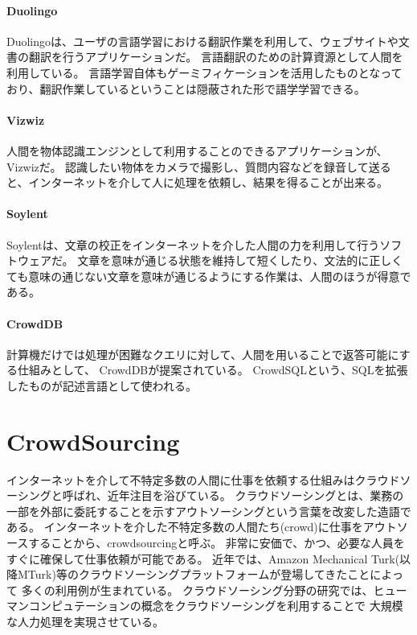 \paragraph{Duolingo}\label{duolingo}

\mbox{}

Duolingo\cite{duolingo}は、ユーザの言語学習における翻訳作業を利用して、ウェブサイトや文書の翻訳を行うアプリケーションだ。
言語翻訳のための計算資源として人間を利用している。
言語学習自体もゲーミフィケーションを活用したものとなっており、翻訳作業しているということは隠蔽された形で語学学習できる。

\paragraph{Vizwiz}\label{vizwiz}

\mbox{}

人間を物体認識エンジンとして利用することのできるアプリケーションが、Vizwiz\cite{vizwiz}だ。
認識したい物体をカメラで撮影し、質問内容などを録音して送ると、インターネットを介して人に処理を依頼し、結果を得ることが出来る。

\paragraph{Soylent}\label{soylent}

\mbox{}

Soylent\cite{soylent}は、文章の校正をインターネットを介した人間の力を利用して行うソフトウェアだ。
文章を意味が通じる状態を維持して短くしたり、文法的に正しくても意味の通じない文章を意味が通じるようにする作業は、人間のほうが得意である。

\paragraph{CrowdDB}\label{crowddb}

\mbox{}

計算機だけでは処理が困難なクエリに対して、人間を用いることで返答可能にする仕組みとして、
CrowdDB\cite{crowddb}が提案されている。
CrowdSQLという、SQLを拡張したものが記述言語として使われる。

\section{CrowdSourcing}\label{crowdsourcing}

インターネットを介して不特定多数の人間に仕事を依頼する仕組みはクラウドソーシングと呼ばれ、近年注目を浴びている。
クラウドソーシングとは、業務の一部を外部に委託することを示すアウトソーシングという言葉を改変した造語である\cite{riseofcrowdsourcing}。
インターネットを介した不特定多数の人間たち(crowd)に仕事をアウトソースすることから、crowdsourcingと呼ぶ。
非常に安価で、かつ、必要な人員をすぐに確保して仕事依頼が可能である。
近年では、Amazon Mechanical
Turk\cite{amt}(以降MTurk)等のクラウドソーシングプラットフォームが登場してきたことによって
多くの利用例が生まれている。
クラウドソーシング分野の研究では、ヒューマンコンピュテーションの概念をクラウドソーシングを利用することで
大規模な人力処理を実現させている。

